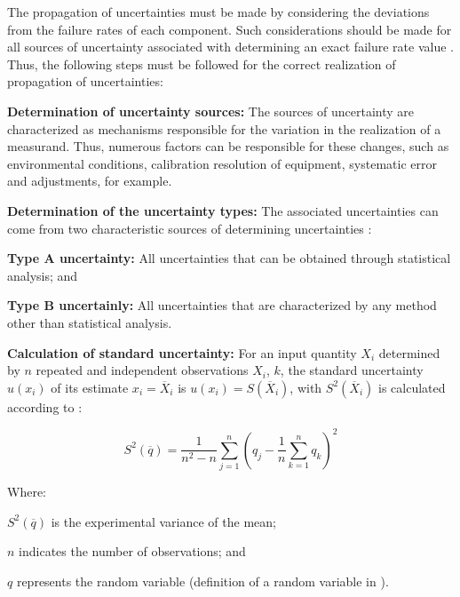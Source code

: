 \documentclass{ws-m3as}
\begin{document}
The propagation of uncertainties must be made by considering the deviations from the failure rates of each component. Such considerations should be made for all sources of uncertainty associated with determining an exact failure rate value \cite{VIM2012}. Thus, the following steps must be followed for the correct realization of propagation of uncertainties:

\begin{romanlist}[(ii)]
	
\item \textbf{Determination of uncertainty sources:} The sources of uncertainty are characterized as mechanisms responsible for the variation in the realization  of a measurand. Thus, numerous factors can be responsible for these changes, such as environmental conditions, calibration resolution of equipment, systematic error and adjustments, for example.

\item \textbf{Determination of the uncertainty types:} The associated uncertainties can come from two characteristic sources of determining uncertainties \cite{VIM2012}: 

\begin{itemlist}
	
\item \textbf{Type A uncertainty:} All uncertainties that can be obtained through statistical analysis; and 
\item \textbf{Type B uncertainly:} All uncertainties that are characterized by any method other than statistical analysis. 
\end{itemlist}

\item \textbf{Calculation of standard uncertainty:} For an input quantity $X_{i}$  determined by $n$ repeated and independent observations $X_{i}$, $k$, the standard uncertainty $u(x_{i})$ of its estimate $x_{i}=\overline{X}_{i}$ is $u(x_{i})=S(\overline{X}_{i})$, with $S^{2}(\overline{X}_{i})$ is calculated according to \cite{GUN2008}:

\begin{equation}
S^{2}(\overline{q})=\frac{1}{n^{2}-n}\sum_{j=1}^{n} (q_{j}-\frac{1}{n}\sum\limits_{k=1}^{n}q_{k})^{2}
\end{equation}

Where:

\begin{itemlist}
	\item $S^{2}(\overline{q})$ is the experimental variance of the mean; 
	\item $n$ indicates the number of observations; and
	\item $q$ represents the random variable (definition of a random variable in \cite{GUN2008}).\\
\end{itemlist}


\end{romanlist}
\end{document}
